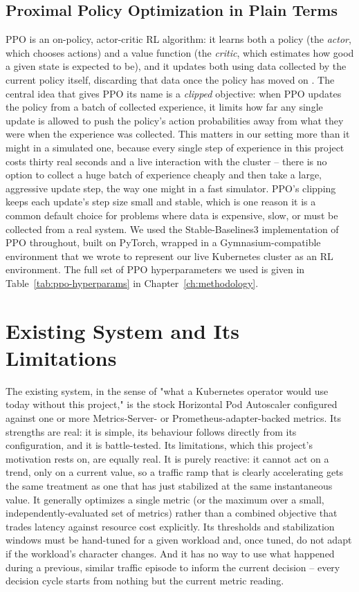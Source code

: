 \subsection{Proximal Policy Optimization in Plain Terms}
\label{sec:intro-ppo-basics}

PPO is an on-policy, actor-critic RL algorithm: it learns both a policy (the
\textit{actor}, which chooses actions) and a value function (the
\textit{critic}, which estimates how good a given state is expected to be),
and it updates both using data collected by the current policy itself,
discarding that data once the policy has moved on \cite{schulman2017ppo}.
The central idea that gives PPO its name is a \textit{clipped} objective:
when PPO updates the policy from a batch of collected experience, it limits
how far any single update is allowed to push the policy's action
probabilities away from what they were when the experience was collected.
This matters in our setting more than it might in a simulated one, because
every single step of experience in this project costs thirty real seconds
and a live interaction with the cluster -- there is no option to collect a
huge batch of experience cheaply and then take a large, aggressive update
step, the way one might in a fast simulator. PPO's clipping keeps each
update's step size small and stable, which is one reason it is a common
default choice for problems where data is expensive, slow, or must be
collected from a real system. We used the Stable-Baselines3 implementation
of PPO \cite{raffin2021sb3} throughout, built on PyTorch, wrapped in a
Gymnasium-compatible environment \cite{towers2024gymnasium} that we wrote to
represent our live Kubernetes cluster as an RL environment. The full set of
PPO hyperparameters we used is given in Table~\ref{tab:ppo-hyperparams} in
Chapter~\ref{ch:methodology}.

\section{Existing System and Its Limitations}
\label{sec:existing-system}

The existing system, in the sense of "what a Kubernetes operator would use
today without this project," is the stock Horizontal Pod Autoscaler
configured against one or more Metrics-Server- or Prometheus-adapter-backed
metrics. Its strengths are real: it is simple, its behaviour follows
directly from its configuration, and it is battle-tested. Its limitations,
which this project's motivation rests on, are equally real. It is purely
reactive: it cannot act on a trend, only on a current value, so a traffic
ramp that is clearly accelerating gets the same treatment as one that has
just stabilized at the same instantaneous value. It generally optimizes a
single metric (or the maximum over a small, independently-evaluated set of
metrics) rather than a combined objective that trades latency against
resource cost explicitly. Its thresholds and stabilization windows must be
hand-tuned for a given workload and, once tuned, do not adapt if the
workload's character changes. And it has no way to use what happened during
a previous, similar traffic episode to inform the current decision -- every
decision cycle starts from nothing but the current metric reading.

